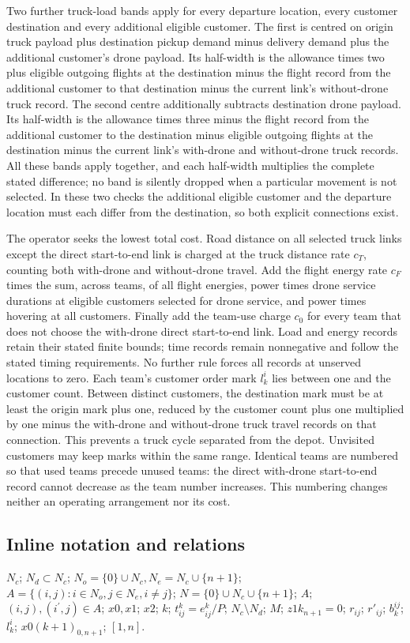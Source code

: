 \documentclass[10pt]{article}
\begin{document}
Two further truck-load bands apply for every departure location, every customer destination and every additional eligible customer. The first is centred on origin truck payload plus destination pickup demand minus delivery demand plus the additional customer's drone payload. Its half-width is the allowance times two plus eligible outgoing flights at the destination minus the flight record from the additional customer to that destination minus the current link's without-drone truck record. The second centre additionally subtracts destination drone payload. Its half-width is the allowance times three minus the flight record from the additional customer to the destination minus eligible outgoing flights at the destination minus the current link's with-drone and without-drone truck records. All these bands apply together, and each half-width multiplies the complete stated difference; no band is silently dropped when a particular movement is not selected. In these two checks the additional eligible customer and the departure location must each differ from the destination, so both explicit connections exist.

The operator seeks the lowest total cost. Road distance on all selected truck links except the direct start-to-end link is charged at the truck distance rate $c_T$, counting both with-drone and without-drone travel. Add the flight energy rate $c_F$ times the sum, across teams, of all flight energies, power times drone service durations at eligible customers selected for drone service, and power times hovering at all customers. Finally add the team-use charge $c_0$ for every team that does not choose the with-drone direct start-to-end link. Load and energy records retain their stated finite bounds; time records remain nonnegative and follow the stated timing requirements. No further rule forces all records at unserved locations to zero. Each team's customer order mark $l_k^i$ lies between one and the customer count. Between distinct customers, the destination mark must be at least the origin mark plus one, reduced by the customer count plus one multiplied by one minus the with-drone and without-drone truck travel records on that connection. This prevents a truck cycle separated from the depot. Unvisited customers may keep marks within the same range. Identical teams are numbered so that used teams precede unused teams: the direct with-drone start-to-end record cannot decrease as the team number increases. This numbering changes neither an operating arrangement nor its cost.

\subsection*{Inline notation and relations}
$N_c$; $N_d\subset N_c$; $N_o=\{0\}\cup N_c,N_e=N_c\cup\{n+1\}$; $A=\{(i,j):i\in N_o,j\in N_e,i\ne j\}$; $N=\{0\}\cup N_c\cup\{n+1\}$; $A$; $(i,j),(i^{\prime},j)\in A$; $x0,x1$; $x2$; $k$; $t^k_{ij}=e^k_{ij}/P$; $N_c\setminus N_d$; $M$; $z1k_{n+1}=0$; $r_{ij}$; $r'_{ij}$; $b_k^{ij}$; $l_k^i$; $x0(k+1)_{0,n+1}$; $[1,n]$.
\end{document}
